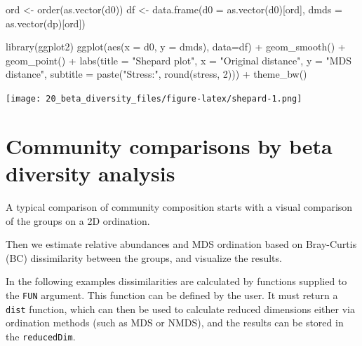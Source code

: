 \documentclass[
]{book}
\newenvironment{Shaded}{\begin{snugshade}}{\end{snugshade}}
\newcommand{\AttributeTok}[1]{\textcolor[rgb]{0.77,0.63,0.00}{#1}}
\newcommand{\DecValTok}[1]{\textcolor[rgb]{0.00,0.00,0.81}{#1}}
\newcommand{\FunctionTok}[1]{\textcolor[rgb]{0.00,0.00,0.00}{#1}}
\newcommand{\NormalTok}[1]{#1}
\newcommand{\OtherTok}[1]{\textcolor[rgb]{0.56,0.35,0.01}{#1}}
\newcommand{\SpecialCharTok}[1]{\textcolor[rgb]{0.00,0.00,0.00}{#1}}
\newcommand{\StringTok}[1]{\textcolor[rgb]{0.31,0.60,0.02}{#1}}
\begin{document}
\begin{Shaded}
\begin{Highlighting}[]
\NormalTok{ord }\OtherTok{\textless{}{-}} \FunctionTok{order}\NormalTok{(}\FunctionTok{as.vector}\NormalTok{(d0))}
\NormalTok{df }\OtherTok{\textless{}{-}} \FunctionTok{data.frame}\NormalTok{(}\AttributeTok{d0 =} \FunctionTok{as.vector}\NormalTok{(d0)[ord],}
                  \AttributeTok{dmds =} \FunctionTok{as.vector}\NormalTok{(dp)[ord])}

\FunctionTok{library}\NormalTok{(ggplot2)}
\FunctionTok{ggplot}\NormalTok{(}\FunctionTok{aes}\NormalTok{(}\AttributeTok{x =}\NormalTok{ d0, }\AttributeTok{y =}\NormalTok{ dmds), }\AttributeTok{data=}\NormalTok{df) }\SpecialCharTok{+} 
       \FunctionTok{geom\_smooth}\NormalTok{() }\SpecialCharTok{+}
       \FunctionTok{geom\_point}\NormalTok{() }\SpecialCharTok{+}       
       \FunctionTok{labs}\NormalTok{(}\AttributeTok{title =} \StringTok{"Shepard plot"}\NormalTok{,}
       \AttributeTok{x =} \StringTok{"Original distance"}\NormalTok{,}
       \AttributeTok{y =} \StringTok{"MDS distance"}\NormalTok{,       }
            \AttributeTok{subtitle =} \FunctionTok{paste}\NormalTok{(}\StringTok{"Stress:"}\NormalTok{, }\FunctionTok{round}\NormalTok{(stress, }\DecValTok{2}\NormalTok{))) }\SpecialCharTok{+}
  \FunctionTok{theme\_bw}\NormalTok{()}
\end{Highlighting}
\end{Shaded}

\texttt{[image: 20\_beta\_diversity\_files/figure-latex/shepard-1.png]}

\hypertarget{community-comparisons-by-beta-diversity-analysis}{%
\section{Community comparisons by beta diversity analysis}\label{community-comparisons-by-beta-diversity-analysis}}

A typical comparison of community composition starts with a visual
comparison of the groups on a 2D ordination.

Then we estimate relative abundances and MDS ordination based on
Bray-Curtis (BC) dissimilarity between the groups, and visualize the
results.

In the following examples dissimilarities are calculated by
functions supplied to the \texttt{FUN} argument. This function can be defined by
the user. It must return a \texttt{dist} function, which can then be used to
calculate reduced dimensions either via ordination methods (such as MDS
or NMDS), and the results can be stored in the \texttt{reducedDim}.
\end{document}
